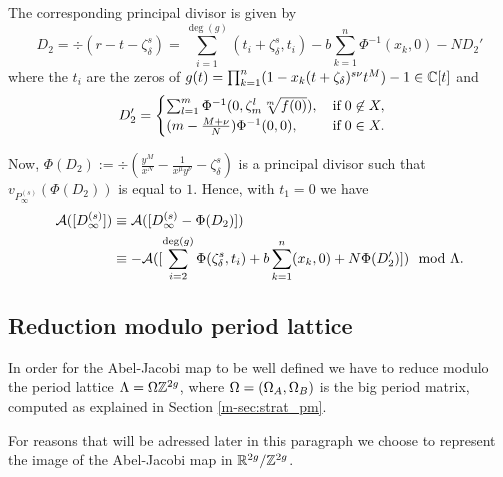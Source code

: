 \documentclass[main.tex]{subfiles}
\begin{document}
    The corresponding principal divisor is given by
     \begin{equation}
      D_2 = \div(r - t - \zeta_{\delta}^s) = \sum_{i = 1}^{\deg(g)} (t_i+\zeta_{\delta}^s,t_i) - b \sum_{k=1}^n
      \Phi^{-1}(x_k,0)- N D_2'
   \end{equation}
      where the $t_i$ are the zeros of $g(t) = \prod_{k=1}^n (1-x_k(t+\zeta_{\delta})^{s\nu}t^M) - 1 \in \mathbb{C}[t]$ and
    \begin{equation}
       D_2' = \begin{cases}
             \sum_{l=1}^m \Phi^{-1}(0,\zeta_m^l \sqrt[m]{f(0)}), \quad \text{if} \; 0 \not\in X,\\
             (m-\frac{M+\nu}{N}) \Phi^{-1}(0,0), \hfill \text{if} \; 0 \in X.
            \end{cases}
    \end{equation}
 
    Now, $\Phi(D_2) := \div \left( \frac{y^M}{x^N} - \frac{1}{x^{\mu}y^{\nu}} - \zeta_{\delta}^s \right)$
    is a principal divisor such that
    $v_{P_{\infty}^{(s)}}(\Phi(D_2))$ is equal to $1$. Hence, with $t_1 = 0$ we have
     \begin{align}
      \mathcal{A}( [D_{\infty}^{(s)}] )  & \equiv  \mathcal{A}([D_{\infty}^{(s)} - \Phi(D_2)])  \\
      & \equiv  -\mathcal{A}( [\sum_{i = 2}^{\operatorname{deg}(g)} \Phi(\zeta_{\delta}^s,t_i) + b \sum_{k=1}^n
      (x_k,0) + N \Phi(D_2') ] )
       \mod \Lambda.
    \end{align}
    
  \subsection{Reduction modulo period lattice}\label{subsec:lat_red}

    In order for the Abel-Jacobi map to be well defined we have to reduce modulo the period lattice $\Lambda = 
  \Omega\mathbb{Z}^{2g}$, where $\Omega = (\Omega_A, \Omega_B)$ is the big period matrix, computed as explained in
  Section \ref{m-sec:strat_pm}.
   
   For reasons that will be adressed later in this paragraph
   we choose to
   represent the image of the Abel-Jacobi map in 
    $\mathbb{R}^{2g} / \mathbb{Z}^{2g}$.
    
\end{document}

